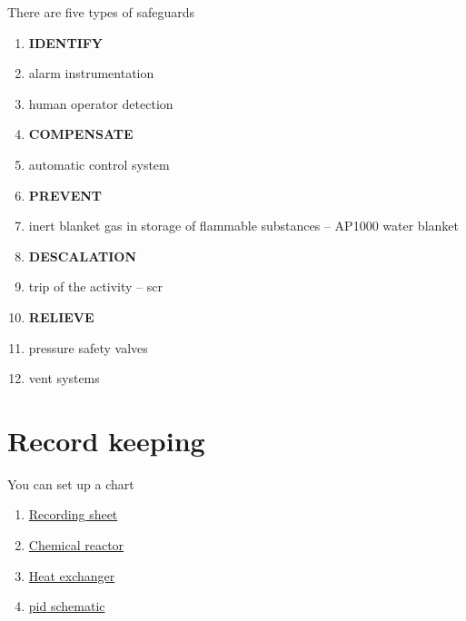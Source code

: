 \documentclass[aspectratio=1610,pdftex,dvipsnames,compress,xcolor={dvipsnames}]{beamer}
\newcommand{\acs}{\acrshort} %
\begin{document}
\addtocounter{framenumber}{-1}
\begin{frame}{There are five types of safeguards}
    \begin{enumerate}[series=outerlist,topsep=0pt,itemsep=1pt,leftmargin=*,label=(\arabic*)]
        \item[]\textbf{IDENTIFY}
        \item[]alarm instrumentation  
        \item[]human operator detection  
            \vspace{0.07in}
        \item[]\textbf{COMPENSATE}
        \item[]automatic control system
            \vspace{0.07in}
        \item[]\textbf{PREVENT}
        \item[]inert blanket gas in storage of flammable substances -- AP1000 water blanket
            \vspace{0.07in}
        \item[]\textbf{DESCALATION}
        \item[]trip of the activity -- \acs{scr}
            \vspace{0.07in}
        \item[]\textbf{RELIEVE}
        \item[]pressure safety valves
        \item[]vent systems
    \end{enumerate}
\end{frame}


\section{Record keeping}


\addtocounter{framenumber}{-1}
\begin{frame}{You can set up a chart}
    \begin{enumerate}[series=outerlist,topsep=0pt,itemsep=21pt,leftmargin=*,label=(\arabic*)]
        \item[]\href{https://red-bag.com/imageslib/BN-EG-UE105_02.pdf}{Recording sheet}
        \item[]\href{http://www.ehsdb.com/resources/Imges-3/Images-3/hazop-15.JPG?timestamp=1436341480548}{Chemical reactor}
        \item[]\href{http://www.ehsdb.com/resources/Imges-3/Images-3/hazop-18.JPG?timestamp=1436342662934}{Heat exchanger}
        \item[]\href{http://group10integratedprojectmay15.weebly.com/hazop-and-pid.html}{\acs{pid} schematic}
    \end{enumerate}
\end{frame}
\end{document}

